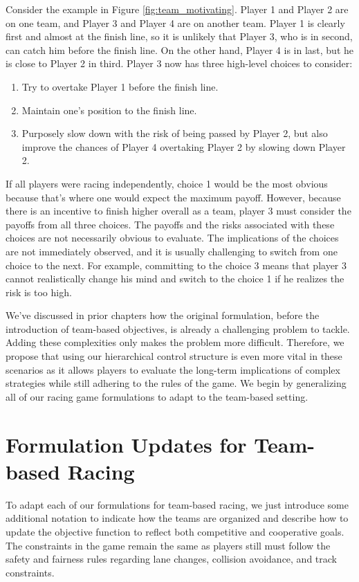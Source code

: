 Consider the example in Figure \ref{fig:team_motivating}. Player 1 and Player 2 are on one team, and Player 3 and Player 4 are on another team. Player 1 is clearly first and almost at the finish line, so it is unlikely that Player 3, who is in second, can catch him before the finish line. On the other hand, Player 4 is in last, but he is close to Player 2 in third. Player 3 now has three high-level choices to consider:
\begin{enumerate}
    \item Try to overtake Player 1 before the finish line.
    \item Maintain one's position to the finish line.
    \item Purposely slow down with the risk of being passed by Player 2, but also improve the chances of Player 4 overtaking Player 2 by slowing down Player 2.
\end{enumerate}
If all players were racing independently, choice 1 would be the most obvious because that's where one would expect the maximum payoff. However, because there is an incentive to finish higher overall as a team, player 3 must consider the payoffs from all three choices. The payoffs and the risks associated with these choices are not necessarily obvious to evaluate. The implications of the choices are not immediately observed, and it is usually challenging to switch from one choice to the next. For example, committing to the choice 3 means that player 3 cannot realistically change his mind and switch to the choice 1 if he realizes the risk is too high. 

We've discussed in prior chapters how the original formulation, before the introduction of team-based objectives, is already a challenging problem to tackle. Adding these complexities only makes the problem more difficult. Therefore, we propose that using our hierarchical control structure is even more vital in these scenarios as it allows players to evaluate the long-term implications of complex strategies while still adhering to the rules of the game. We begin by generalizing all of our racing game formulations to adapt to the team-based setting.

\section{Formulation Updates for Team-based Racing}
To adapt each of our formulations for team-based racing, we just introduce some additional notation to indicate how the teams are organized and describe how to update the objective function to reflect both competitive and cooperative goals. The constraints in the game remain the same as players still must follow the safety and fairness rules regarding lane changes, collision avoidance, and track constraints.
